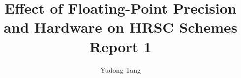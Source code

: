 \title{\texorpdfstring{Effect of Floating-Point Precision and Hardware on HRSC Schemes\\Report 1}{Effect of Floating-Point Precision and Hardware on HRSC Schemes - Report 1}}


\author{Yudong Tang}






\supervisorrole{}


     







\subject{Scientific Computing}

